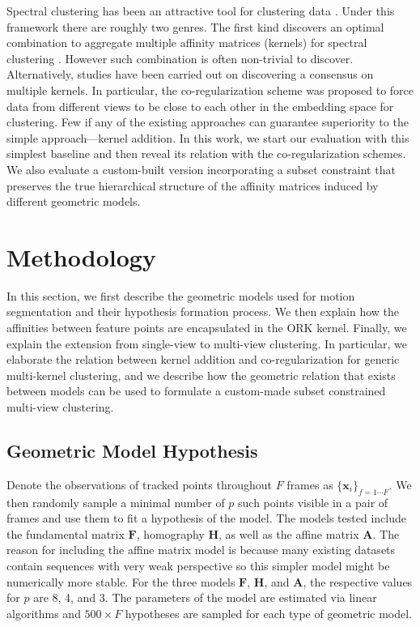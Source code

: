 \documentclass[10pt,twocolumn,letterpaper]{article}
\newcommand{\scal}[1]{\mathit{#1}}
\newcommand{\vect}[1]{\mathbf{#1}}
\begin{document}
Spectral clustering has been an attractive tool for clustering data  \cite{von2007tutorial}. Under this framework there are roughly two genres. The first kind discovers an optimal combination to aggregate multiple affinity matrices (kernels) for spectral clustering \cite{Huang2012,lange2006fusion,Wang2013}. However such combination is often non-trivial to discover. Alternatively, studies have been carried out on discovering a consensus on multiple kernels. In particular, the co-regularization scheme \cite{Kumar2011} was proposed to force data from different views to be close to each other in the embedding space for clustering. Few if any of the existing approaches can guarantee superiority to the simple approach---kernel addition. In this work, we start our evaluation with this simplest baseline and then reveal its relation with the co-regularization schemes. {We also evaluate a custom-built version incorporating a subset constraint that preserves the true hierarchical structure of the affinity matrices induced by different geometric models}.


\section{Methodology}

In this section, we first describe the geometric models used for motion segmentation and their hypothesis formation process. We then explain how the affinities between feature points are encapsulated in the ORK kernel\cite{Lai2017}. Finally, we explain the extension from single-view to multi-view clustering. In particular, we elaborate the relation between kernel addition and co-regularization for generic multi-kernel clustering, and we describe how the geometric relation that exists between models can be used to formulate a custom-made subset constrained multi-view clustering.

\subsection{Geometric Model Hypothesis}

Denote the observations of tracked points throughout $\scal{F}$ frames as $\{\vect{x}_{i}\}_{f=1\cdots F}$. We then randomly sample a minimal number of $p$ such points visible in a pair of frames and use them to fit a hypothesis of the model. The models tested include the fundamental matrix $\mathbf{F}$, homography $\mathbf{H}$, as well as the affine matrix $\mathbf{A}$. The reason for including the affine matrix model is because many existing datasets contain sequences with very weak perspective so this simpler model might be numerically more stable. For the three models $\mathbf{F}$, $\mathbf{H}$, and $\mathbf{A}$, the respective values for $p$ are 8, 4, and 3. The parameters of the model are estimated via linear algorithms \cite{hartley2003multiple} and $500\times F$ hypotheses are sampled for each type of geometric model. 
\end{document}
